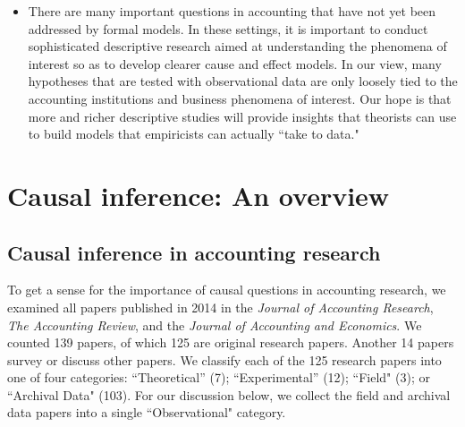 \documentclass[12pt,reqno,titlepage]{amsart}
\theoremstyle{definition}
\begin{document}
\begin{doublespace}
\begin{itemize}
\item There are many important questions in accounting that have not yet been addressed by formal models.
	In these settings, it is important to conduct sophisticated descriptive research aimed at understanding the phenomena of interest so as to develop clearer cause and effect models.
	In our view, many hypotheses that are tested with observational data are only loosely tied to the accounting institutions and business phenomena of interest. 
	Our hope is that more and richer descriptive studies will provide insights that theorists can use to build models that empiricists can actually ``take to data."
\end{itemize}

\section{Causal inference: An overview} \label{sec:causal}

\subsection{Causal inference in accounting research}

To get a sense for the importance of causal questions in accounting research,
we examined all papers published in 2014 in the \textit{Journal of Accounting Research}, \textit{The Accounting Review}, and the \textit{Journal of Accounting and Economics}.
We counted 139 papers, of which 125 are original research papers. Another 14 papers survey or discuss other papers.
We classify each of the 125 research papers into one of four categories:  ``Theoretical'' (7); ``Experimental'' (12); ``Field" (3); or ``Archival Data" (103). 
For our discussion below, we collect the field and archival data papers into a single  ``Observational" category.


\end{doublespace}
\end{document}
